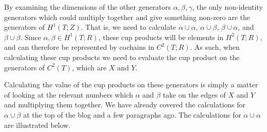 \documentclass[12pt,a4paper]{article}
\begin{document}
By examining the dimensions of the other generators $\alpha, \beta, \gamma$, the only non-identity generators which could multiply together and give something non-zero are the generators of $H^1(T;Z)$. That is, we need to calculate $\alpha \cup \alpha$, $\alpha \cup \beta$, $\beta \cup \alpha$, and $\beta \cup \beta$. Since $\alpha,\beta \in H^1(T;R)$, these cup products will be elements in $H^2(T;R)$, and can therefore be represented by cochains in $C^2(T;R)$. As such, when calculating these cup products we need to evaluate the cup product on the generators of $C^2(T)$, which are $X$ and $Y$.

Calculating the value of the cup products on these generators is simply a matter of looking at the relevant numbers which $\alpha$ and $\beta$ take on the edges of $X$ and $Y$ and multiplying them together. We have already covered the calculations for $\alpha \cup \beta$ at the top of the blog and a few paragraphs ago. The calculations for $\alpha \cup \alpha$ are illustrated below. 
\end{document}
